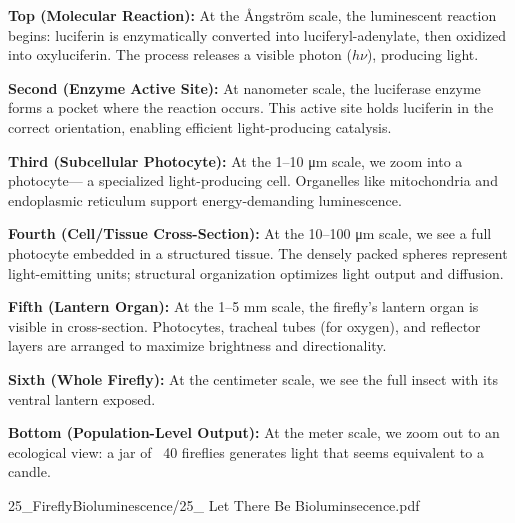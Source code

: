 \begin{SideNotePage}{
  \textbf{Top (Molecular Reaction):}  
  At the Ångström scale, the luminescent reaction begins: luciferin is enzymatically converted into luciferyl-adenylate, then oxidized into oxyluciferin. The process releases a visible photon ($h\nu$), producing light. \par

  \textbf{Second (Enzyme Active Site):}  
  At nanometer scale, the luciferase enzyme forms a pocket where the reaction occurs. This active site holds luciferin in the correct orientation, enabling efficient light-producing catalysis. \par

  \textbf{Third (Subcellular Photocyte):}  
  At the 1–10 μm scale, we zoom into a photocyte— a specialized light-producing cell. Organelles like mitochondria and endoplasmic reticulum support energy-demanding luminescence. \par

  \textbf{Fourth (Cell/Tissue Cross-Section):}  
  At the 10–100 μm scale, we see a full photocyte embedded in a structured tissue. The densely packed spheres represent light-emitting units; structural organization optimizes light output and diffusion. \par

  \textbf{Fifth (Lantern Organ):}  
  At the 1–5 mm scale, the firefly's lantern organ is visible in cross-section. Photocytes, tracheal tubes (for oxygen), and reflector layers are arranged to maximize brightness and directionality. \par

  \textbf{Sixth (Whole Firefly):}  
  At the centimeter scale, we see the full insect with its ventral lantern exposed. \par

  \textbf{Bottom (Population-Level Output):}  
  At the meter scale, we zoom out to an ecological view: a jar of ~40 fireflies generates light that seems equivalent to a candle.\par

}{25_FireflyBioluminescence/25_ Let There Be Bioluminsecence.pdf}
\end{SideNotePage}
